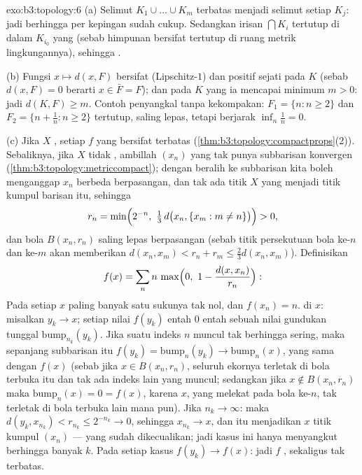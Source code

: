\begin{solution}{exo:b3:topology:6}
(a) Selimut $K_1 \cup \dots \cup K_m$ terbatas menjadi selimut
setiap $K_j$: jadi berhingga  per kepingan sudah cukup. Sedangkan
irisan $\bigcap K_i$ tertutup di dalam $K_{i_0}$ yang 
(sebab himpunan  bersifat tertutup di ruang metrik lingkungannya), sehingga
.

(b) Fungsi $x \mapsto d(x, F)$ bersifat  (Lipschitz-$1$) dan
positif sejati pada $K$ (sebab $d(x, F) = 0$ berarti $x \in \bar F =
F$); dan pada $K$ yang  ia mencapai minimum $m > 0$: jadi $d(K, F)
\geq m$. Contoh penyangkal tanpa kekompakan: $F_1 = \{n : n \geq
2\}$ dan $F_2 = \{n + \frac1n : n \geq 2\}$ tertutup,
saling lepas, tetapi berjarak $\inf_n \frac1n = 0$.

(c) Jika $X$ , setiap $f$ yang  bersifat terbatas
(\cref{thm:b3:topology:compactprops}(2)). Sebaliknya, jika $X$
tidak , ambillah $(x_n)$ yang tak punya subbarisan konvergen
(\cref{thm:b3:topology:metriccompact}); dengan beralih ke
subbarisan kita boleh menganggap $x_n$ berbeda berpasangan, dan tak ada
titik $X$ yang menjadi titik kumpul barisan itu, sehingga
\[
r_n = \min\Bigl(2^{-n},\ \tfrac13\,d\bigl(x_n, \{x_m : m \neq
n\}\bigr)\Bigr) > 0,
\]
dan bola $B(x_n, r_n)$ saling lepas berpasangan (sebab titik persekutuan
bola ke-$n$ dan ke-$m$ akan memberikan $d(x_n, x_m) < r_n +
r_m \leq \frac23 d(x_n, x_m)$). Definisikan
\[
f(x) = \sum_{n} n\,\max\Bigl(0,\ 1 - \frac{d(x,
x_n)}{r_n}\Bigr):
\]
Pada setiap $x$ paling banyak satu sukunya tak nol, dan $f(x_n) = n$.
 di $x$: misalkan $y_k \to x$; setiap nilai $f(y_k)$
entah $0$ entah sebuah nilai gundukan tunggal $\mathrm{bump}_{n_k}(y_k)$.
Jika suatu indeks $n$ muncul tak berhingga sering, maka sepanjang
subbarisan itu $f(y_k) = \mathrm{bump}_n(y_k) \to
\mathrm{bump}_n(x)$, yang sama dengan $f(x)$ (sebab jika $x \in B(x_n,
r_n)$, seluruh ekornya terletak di bola terbuka itu dan tak ada indeks
lain yang muncul; sedangkan jika $x \notin B(x_n, r_n)$ maka
$\mathrm{bump}_n(x) = 0 = f(x)$, karena $x$, yang melekat pada bola
ke-$n$, tak terletak di bola terbuka lain mana pun). Jika $n_k \to \infty$:
maka $d(y_k, x_{n_k}) < r_{n_k} \leq 2^{-n_k} \to 0$, sehingga $x_{n_k}
\to x$, dan itu menjadikan $x$ titik kumpul $(x_n)$ --- yang sudah dikecualikan; jadi
kasus ini hanya menyangkut berhingga banyak $k$. Pada setiap kasus
$f(y_k) \to f(x)$: jadi $f$ , sekaligus tak terbatas.
\end{solution}

